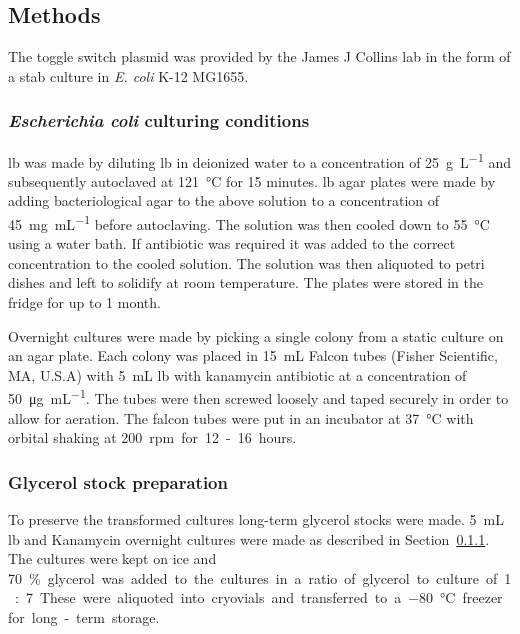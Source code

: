 \subsection{Methods}
\label{sec:experimental_methods}
The toggle switch plasmid was provided by the James J Collins lab in the form of a stab culture in \textit{E. coli} K-12 MG1655.

\subsubsection{\textit{Escherichia coli} culturing conditions}
\label{sec:overnigh_cult}

\acrfull{lb} was made by diluting \acrshort{lb} in deionized water to a concentration of \SI{25}{\gram\per\liter} and subsequently autoclaved at \SI{121}{\celsius} for 15 minutes. \acrshort{lb} agar plates were made by adding bacteriological agar to the above solution to a concentration of \SI{45}{\milli\gram\per\milli\liter} before autoclaving. The solution was then cooled down to \SI{55}{\celsius} using a water bath. If antibiotic was required it was added to the correct concentration to the cooled solution. The solution was then aliquoted to petri dishes and left to solidify at room temperature. The plates were stored in the fridge for up to 1 month. 


Overnight cultures were made by picking a single colony from a static culture on an agar plate. Each colony was placed in \SI{15}{\milli\liter} Falcon tubes (Fisher Scientific, MA, U.S.A) with \SI{5}{\milli\liter} \acrshort{lb} with kanamycin antibiotic at a concentration of \SI{50}{\micro\gram\per\milli\liter}. The tubes were then screwed loosely and taped securely in order to allow for aeration. The falcon tubes were put in an incubator at \SI{37}{\celsius} with orbital shaking at \SI{200} rpm for 12-16 hours. 

\subsubsection{Glycerol stock preparation}
\label{sec:glycerol_stock}
To preserve the transformed cultures long-term glycerol stocks were made. \SI{5}{\milli\liter} \acrshort{lb} and Kanamycin overnight cultures were made as described in Section~\ref{sec:overnigh_cult}. The cultures were kept on ice and \SI{70}\% glycerol was added to the cultures in a ratio of glycerol to culture of 1:7. These were aliquoted into cryovials and transferred to a \SI{-80}{\celsius} freezer for long-term storage.


